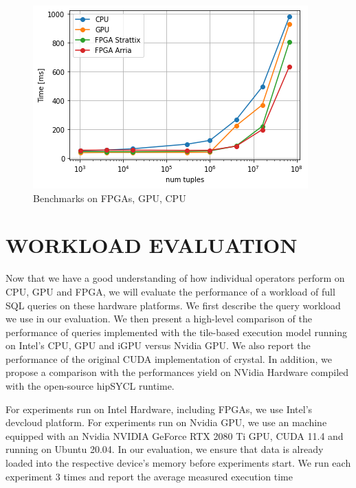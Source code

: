 \documentclass[sigconf, nonacm]{acmart}
\begin{document}
\begin{figure}[H]
  \centering
  \includegraphics[width=\linewidth]{figures/bench-fpga-gpu-cpu.png}
  \caption{Benchmarks on FPGAs, GPU, CPU}
  \label{fig:fpga-cpu-gpu}
\end{figure}



\section{WORKLOAD EVALUATION}
Now that we have a good understanding of how individual operators perform on CPU, GPU and FPGA, we will evaluate the performance of a workload of full SQL queries on these
hardware platforms. 
We first describe the query workload we use in our evaluation. We then present a high-level comparison of the performance of queries implemented with the tile-based execution model running on Intel's CPU, GPU and iGPU versus Nvidia GPU. We also report the performance of the original CUDA implementation of crystal. In addition, we propose a comparison with the performances yield on NVidia Hardware compiled with the open-source hipSYCL\cite{hipsycl} runtime. 

For experiments run on Intel Hardware, including FPGAs, we use Intel's devcloud platform. For experiments run on
Nvidia GPU, we use an machine equipped with an Nvidia NVIDIA GeForce RTX 2080 Ti
GPU, CUDA 11.4 and running on Ubuntu 20.04. In our evaluation, we
ensure that data is already loaded into the respective device’s
memory before experiments start. We run each experiment 3 times and report the average measured execution time
\end{document}
